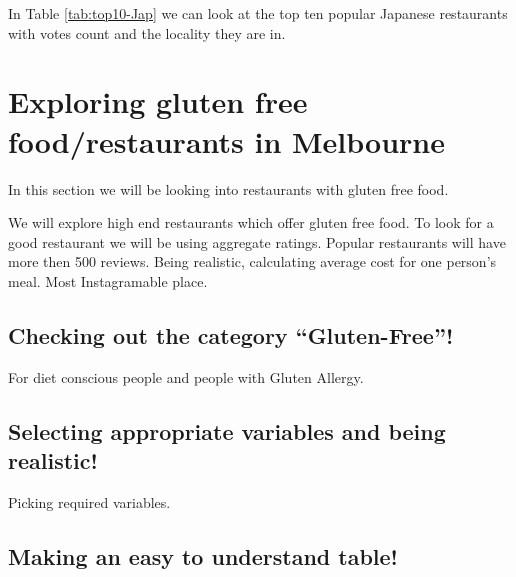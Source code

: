 \documentclass[11pt,a4paper,]{article}
\begin{document}
In Table \ref{tab:top10-Jap} we can look at the top ten popular Japanese restaurants with votes count and the locality they are in.

\clearpage

\hypertarget{exploring-gluten-free-foodrestaurants-in-melbourne}{%
\section{Exploring gluten free food/restaurants in Melbourne}\label{exploring-gluten-free-foodrestaurants-in-melbourne}}

In this section we will be looking into restaurants with gluten free food.

We will explore high end restaurants which offer gluten free food.
To look for a good restaurant we will be using aggregate ratings.
Popular restaurants will have more then 500 reviews.
Being realistic, calculating average cost for one person's meal.
Most Instagramable place.

\hypertarget{checking-out-the-category-gluten-free}{%
\subsection{Checking out the category ``Gluten-Free''!}\label{checking-out-the-category-gluten-free}}

For diet conscious people and people with Gluten Allergy.

\hypertarget{selecting-appropriate-variables-and-being-realistic}{%
\subsection{Selecting appropriate variables and being realistic!}\label{selecting-appropriate-variables-and-being-realistic}}

Picking required variables.

\hypertarget{making-an-easy-to-understand-table}{%
\subsection{Making an easy to understand table!}\label{making-an-easy-to-understand-table}}
\end{document}
